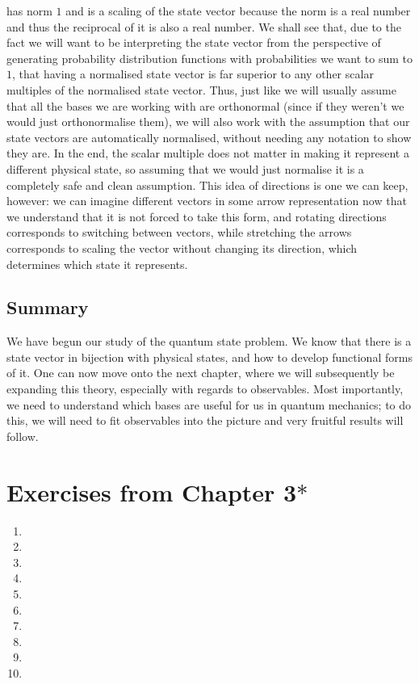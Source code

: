 has norm $1$ and is a scaling of the state vector because the norm is a real number and thus the reciprocal of it is also a real number. We shall see that, due to the fact we will want to be interpreting the state vector from the perspective of generating probability distribution functions with probabilities we want to sum to $1$, that having a normalised state vector is far superior to any other scalar multiples of the normalised state vector. Thus, just like we will usually assume that all the bases we are working with are orthonormal (since if they weren't we would just orthonormalise them), we will also work with the assumption that our state vectors are automatically normalised, without needing any notation to show they are. In the end, the scalar multiple does not matter in making it represent a different physical state, so assuming that we would just normalise it is a completely safe and clean assumption. This idea of directions is one we can keep, however: we can imagine different vectors in some arrow representation now that we understand that it is not forced to take this form, and rotating directions corresponds to switching between vectors, while stretching the arrows corresponds to scaling the vector without changing its direction, which determines which state it represents.
\subsection{Summary}
We have begun our study of the quantum state problem. We know that there is a state vector in bijection with physical states, and how to develop functional forms of it. One can now move onto the next chapter, where we will subsequently be expanding this theory, especially with regards to observables. Most importantly, we need to understand which bases are useful for us in quantum mechanics; to do this, we will need to fit observables into the picture and very fruitful results will follow. 
\section{Exercises from Chapter 3$\ast$}
\begin{enumerate}
    \item 
    \item
    \item
    \item
    \item
    \item
    \item
    \item
    \item
    \item
\end{enumerate}
